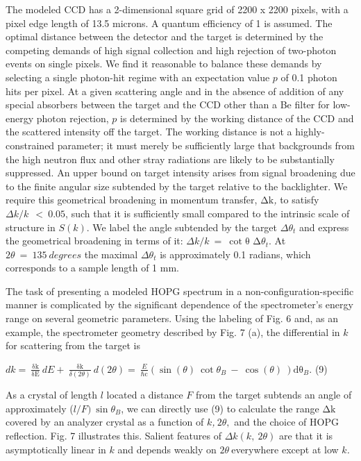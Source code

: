 The modeled CCD has a 2-dimensional square grid of 2200 x 2200 pixels,
with a pixel edge length of 13.5 microns. A quantum efficiency of 1 is
assumed. The optimal distance between the detector and the target is
determined by the competing demands of high signal collection and high
rejection of two-photon events on single pixels. We find it reasonable
to balance these demands by selecting a single photon-hit regime with an
expectation value \(p\) of 0.1 photon hits per pixel. At a given
scattering angle and in the absence of addition of any special absorbers
between the target and the CCD other than a Be filter for low-energy
photon rejection, \(p\) is determined by the working distance of the CCD
and the scattered intensity off the target. The working distance is not
a highly-constrained parameter; it must merely be sufficiently large
that backgrounds from the high neutron flux and other stray radiations
are likely to be substantially suppressed. An upper bound on target
intensity arises from signal broadening due to the finite angular size
subtended by the target relative to the backlighter. We require this
geometrical broadening in momentum transfer, \(\text{Δk}\)\emph{,} to
satisfy \(\Delta k/k\ \  < \ 0.05\), such that it is sufficiently small
compared to the intrinsic scale of structure in \(S(k)\). We label the
angle subtended by the target \(\Delta\theta_{t}\) and express the
geometrical broadening in terms of it:
\(\Delta k/k\  = \ \cot{\text{θ\ Δ}\theta_{t}}.\) At
\(2\theta\  = \ 135\ degrees\) the maximal \(\Delta\theta_{t}\) is
approximately 0.1 radians, which corresponds to a sample length of 1 mm.

The task of presenting a modeled HOPG spectrum in a
non-configuration-specific manner is complicated by the significant
dependence of the spectrometer's energy range on several geometric
parameters. Using the labeling of Fig. 6 and, as an example, the
spectrometer geometry described by Fig. 7 (a), the differential in \(k\)
for scattering from the target is

\(dk = \ \frac{\text{δk}}{\text{δE}}\ dE + \ \frac{\text{δk}}{\delta(2\theta)}\ d(2\theta) = \ \frac{E}{\text{ℏc}}\left( \sin{(\theta)\ \cot{\theta_{B}\  - \ \cos{(\theta)}}}\  \right)\text{dθ}_{B}\).
(9)

As a crystal of length \(l\) located a distance \(F\) from the target
subtends an angle of approximately (\(l/F)\ \sin\theta_{B}\), we can
directly use (9) to calculate the range \(\text{Δk}\) covered by an
analyzer crystal as a function of \(k\)\emph{,}\(\ 2\theta,\) and the
choice of HOPG reflection. Fig. 7 illustrates this. Salient features of
\(\Delta k(k,\ 2\theta)\) are that it is asymptotically linear in \(k\)
and depends weakly on \(2\theta\ \)everywhere except at low
\(k\)\emph{.}

